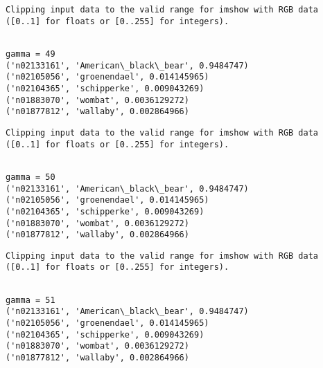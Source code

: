 \documentclass[11pt]{article}
\begin{document}
    \begin{Verbatim}[commandchars=\\\{\}]
Clipping input data to the valid range for imshow with RGB data ([0..1] for floats or [0..255] for integers).

    \end{Verbatim}

    \begin{Verbatim}[commandchars=\\\{\}]

gamma = 49
('n02133161', 'American\_black\_bear', 0.9484747)
('n02105056', 'groenendael', 0.014145965)
('n02104365', 'schipperke', 0.009043269)
('n01883070', 'wombat', 0.0036129272)
('n01877812', 'wallaby', 0.002864966)

    \end{Verbatim}

    \begin{Verbatim}[commandchars=\\\{\}]
Clipping input data to the valid range for imshow with RGB data ([0..1] for floats or [0..255] for integers).

    \end{Verbatim}

    \begin{Verbatim}[commandchars=\\\{\}]

gamma = 50
('n02133161', 'American\_black\_bear', 0.9484747)
('n02105056', 'groenendael', 0.014145965)
('n02104365', 'schipperke', 0.009043269)
('n01883070', 'wombat', 0.0036129272)
('n01877812', 'wallaby', 0.002864966)

    \end{Verbatim}

    \begin{Verbatim}[commandchars=\\\{\}]
Clipping input data to the valid range for imshow with RGB data ([0..1] for floats or [0..255] for integers).

    \end{Verbatim}

    \begin{Verbatim}[commandchars=\\\{\}]

gamma = 51
('n02133161', 'American\_black\_bear', 0.9484747)
('n02105056', 'groenendael', 0.014145965)
('n02104365', 'schipperke', 0.009043269)
('n01883070', 'wombat', 0.0036129272)
('n01877812', 'wallaby', 0.002864966)

    \end{Verbatim}
\end{document}
